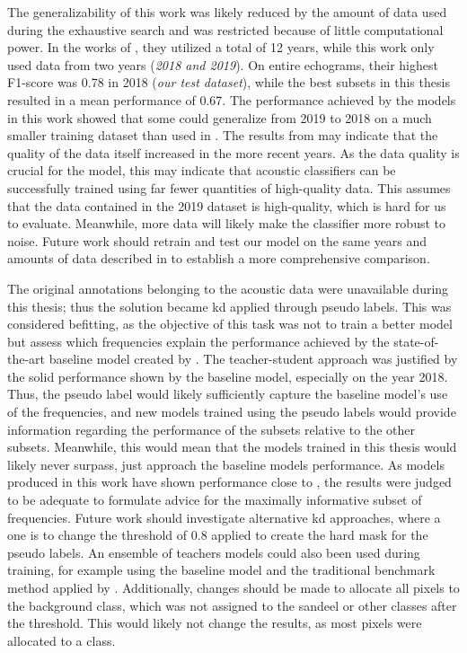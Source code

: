     The generalizability of this work was likely reduced by the amount of data used during the exhaustive search and was restricted because of little computational power. In the works of \citeauthor{brautaset2020acoustic}, they utilized a total of 12 years, while this work only used data from two years (\textit{2018 and 2019}). On entire echograms, their highest F1-score was 0.78 in 2018 (\textit{our test dataset}), while the best subsets in this thesis resulted in a mean performance of 0.67. The performance achieved by the models in this work showed that some could generalize from 2019 to 2018 on a much smaller training dataset than used in \citet{brautaset2020acoustic}. The results from \citeauthor{brautaset2020acoustic} may indicate that the quality of the data itself increased in the more recent years. As the data quality is crucial for the model, this may indicate that acoustic classifiers can be successfully trained using far fewer quantities of high-quality data. This assumes that the data contained in the 2019 dataset is high-quality, which is hard for us to evaluate. Meanwhile, more data will likely make the classifier more robust to noise. Future work should retrain and test our model on the same years and amounts of data described in \citeauthor{brautaset2020acoustic} to establish a more comprehensive comparison.  
    
    
    The original annotations belonging to the acoustic data were unavailable during this thesis; thus the solution became \gls{kd} applied through pseudo labels. This was considered befitting, as the objective of this task was not to train a better model but assess which frequencies explain the performance achieved by the state-of-the-art baseline model created by \citet{brautaset2020acoustic}. The teacher-student approach was justified by the solid performance shown by the baseline model, especially on the year 2018. Thus, the pseudo label would likely sufficiently capture the baseline model's use of the frequencies, and new models trained using the pseudo labels would provide information regarding the performance of the subsets relative to the other subsets. Meanwhile, this would mean that the models trained in this thesis would likely never surpass, just approach the baseline models performance. As models produced in this work have shown performance close to \citeauthor{brautaset2020acoustic}, the results were judged to be adequate to formulate advice for the maximally informative subset of frequencies. Future work should investigate alternative \gls{kd} approaches, where a one is to change the threshold of 0.8 applied to create the hard mask for the pseudo labels. An ensemble of teachers models could also been used during training, for example using the baseline model and the traditional benchmark method applied by \citeauthor{brautaset2020acoustic}. Additionally, changes should be made to allocate all pixels to the background class, which was not assigned to the sandeel or other classes after the threshold. This would likely not change the results, as most pixels were allocated to a class. 

